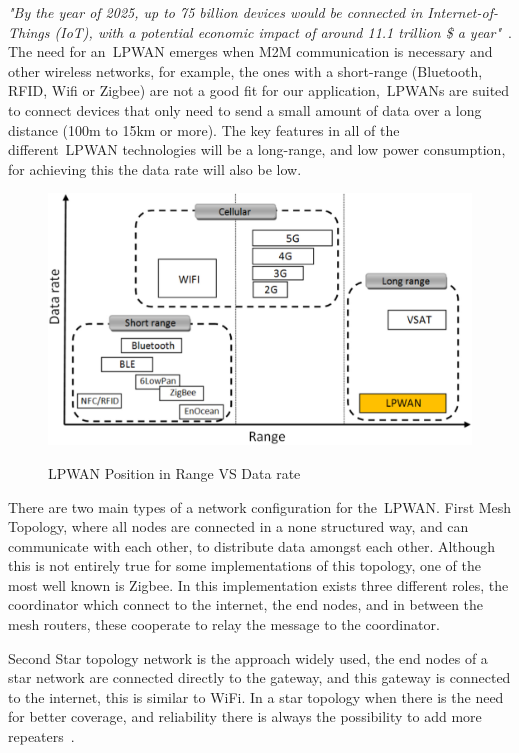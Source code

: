 \textit{"By the year of 2025, up to 75 billion devices would be connected in Internet-of-Things (\gls{IoT}), with a potential economic impact of around 11.1 trillion \$ a year"}~\cite{ LPIkpehai2019}. The need for an~\gls{LPWAN} emerges when M2M communication is necessary and other wireless networks, for example, the ones with a short-range (Bluetooth, RFID, Wifi or Zigbee) are not a good fit for our application,~\gls{LPWAN}s are suited to connect devices that only need to send a small amount of data over a long distance (100m to 15km or more). The key features in all of the  different~\gls{LPWAN} technologies will be a long-range, and low power consumption, for achieving this the data rate will also be low.

\begin{figure}[htbp]
  \centering
  
    {\includegraphics[width=0.6\linewidth]{Chapters/Figures/LPWAN-Positioning.jpg}}%
 
  \caption{LPWAN Position in Range VS Data rate~\cite{Mekki2019}}
  \label{fig:LPWAN_Positioning}
\end{figure}

There are two main types of a network configuration for the~\gls{LPWAN}.
First Mesh Topology, where all nodes are connected in a none structured way, and can communicate with each other, to distribute data amongst each other. Although this is not entirely true for some implementations of this topology, one of the most well known is Zigbee. In this implementation exists three different roles, the coordinator which connect to the internet, the end nodes, and in between the mesh routers, these cooperate to relay the message to the coordinator. 

Second Star topology network is the approach widely used, the end nodes of a star network are connected directly to the gateway, and this gateway is connected to the internet, this is similar to WiFi. In a star topology when there is the  need for  better coverage,  and reliability there is always the possibility to add more repeaters~\cite{LPLinkLabs}.

